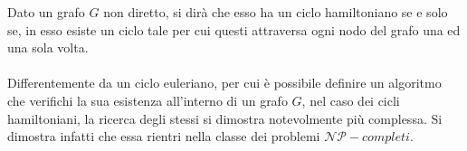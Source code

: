 \documentclass{subfiles}
\begin{document}
Dato un grafo \(G\) non diretto, si dirà che esso ha un ciclo hamiltoniano se e solo se,
in esso esiste un ciclo tale per cui questi attraversa ogni nodo del grafo una ed una sola volta.
\\ \\
Differentemente da un ciclo euleriano, per cui è possibile definire un algoritmo che verifichi la sua esistenza all'interno di un grafo \(G\),
nel caso dei cicli hamiltoniani, la ricerca degli stessi si dimostra notevolmente più complessa.
Si dimostra infatti che essa rientri nella classe dei problemi \(\mathcal{NP}-completi\).
\end{document}
